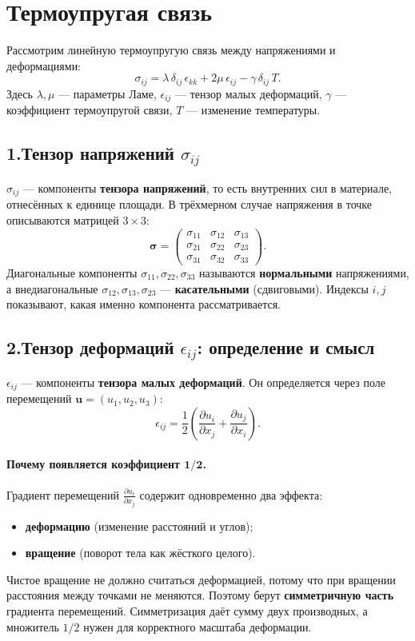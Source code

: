 \section*{Термоупругая связь}

Рассмотрим линейную термоупругую связь между напряжениями и деформациями:
\begin{equation}
\sigma_{ij}=\lambda\,\delta_{ij}\,\epsilon_{kk}+2\mu\,\epsilon_{ij}-\gamma\,\delta_{ij}\,T.
\end{equation}
Здесь $\lambda,\mu$ --- параметры Ламе, $\epsilon_{ij}$ --- тензор малых деформаций,
$\gamma$ --- коэффициент термоупругой связи, $T$ --- изменение температуры.

\subsection*{1.\;Тензор напряжений $\sigma_{ij}$}
$\sigma_{ij}$ --- компоненты \textbf{тензора напряжений}, то есть внутренних сил в материале,
отнесённых к единице площади. В трёхмерном случае напряжения в точке описываются матрицей $3\times 3$:
\[
\boldsymbol{\sigma}=
\begin{pmatrix}
\sigma_{11} & \sigma_{12} & \sigma_{13}\\
\sigma_{21} & \sigma_{22} & \sigma_{23}\\
\sigma_{31} & \sigma_{32} & \sigma_{33}
\end{pmatrix}.
\]
Диагональные компоненты $\sigma_{11},\sigma_{22},\sigma_{33}$ называются \textbf{нормальными} напряжениями,
а внедиагональные $\sigma_{12},\sigma_{13},\sigma_{23}$ --- \textbf{касательными} (сдвиговыми).
Индексы $i,j$ показывают, какая именно компонента рассматривается.

\subsection*{2.\;Тензор деформаций $\epsilon_{ij}$: определение и смысл}
$\epsilon_{ij}$ --- компоненты \textbf{тензора малых деформаций}. Он определяется через поле перемещений
$\mathbf{u}=(u_1,u_2,u_3)$:
\begin{equation}
\epsilon_{ij}=\frac{1}{2}\left(\frac{\partial u_i}{\partial x_j}+\frac{\partial u_j}{\partial x_i}\right).
\end{equation}

\paragraph{Почему появляется коэффициент $\mathbf{1/2}$.}
Градиент перемещений $\frac{\partial u_i}{\partial x_j}$ содержит одновременно два эффекта:
\begin{itemize}
\item \textbf{деформацию} (изменение расстояний и углов);
\item \textbf{вращение} (поворот тела как жёсткого целого).
\end{itemize}
Чистое вращение не должно считаться деформацией, потому что при вращении расстояния между точками не меняются.
Поэтому берут \textbf{симметричную часть} градиента перемещений. Симметризация даёт сумму двух производных,
а множитель $1/2$ нужен для корректного масштаба деформации.

